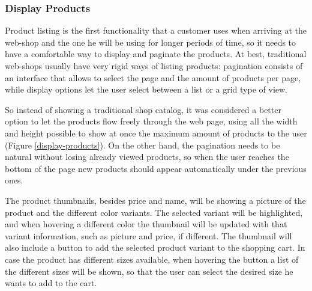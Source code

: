 \subsubsection{Display Products}
Product listing is the first functionality that a customer uses when arriving at the web-shop and the one he will be using for longer periods of time, so it needs to have a comfortable way to display and paginate the products. At best, traditional web-shops usually have very rigid ways of listing products: pagination consists of an interface that allows to select the page and the amount of products per page, while display options let the user select between a list or a grid type of view.

So instead of showing a traditional shop catalog, it was considered a better option to let the products flow freely through the web page, using all the width and height possible to show at once the maximum amount of products to the user (Figure \ref{display-products}). On the other hand, the pagination needs to be natural without losing already viewed products, so when the user reaches the bottom of the page new products should appear automatically under the previous ones.

The product thumbnails, besides price and name, will be showing a picture of the product and the different color variants. The selected variant will be highlighted, and when hovering a different color the thumbnail will be updated with that variant information, such as picture and price, if different. The thumbnail will also include a button to add the selected product variant to the shopping cart. In case the product has different sizes available, when hovering the button a list of the different sizes will be shown, so that the user can select the desired size he wants to add to the cart.

